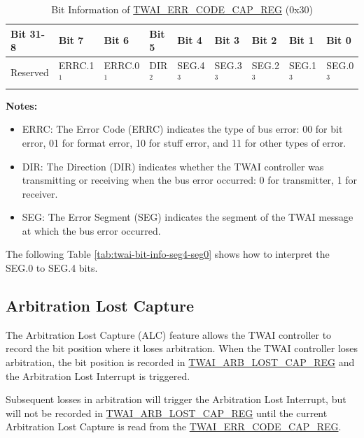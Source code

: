 \documentclass[main\_\_EN.tex]{subfiles}
\begin{document}
\begin{longtable}[c]{|p{1.4cm}|p{1.4cm}|p{1.4cm}|p{1.4cm}|p{1.4cm}|p{1.4cm}|p{1.4cm}|p{1.4cm}|p{1.4cm}|}
    \caption{Bit Information of \hyperref[regdesc:TWAIERRCODECAPREG]{TWAI\_ERR\_CODE\_CAP\_REG} (0x30)}
    \label{tab:twai-bit-info-error-code-cap-reg}\\
    \hline
    \rowcolor{lightgray}
    \textbf{Bit 31-8} & \textbf{Bit 7} & \textbf{Bit 6} & \textbf{Bit 5} & \textbf{Bit 4} & \textbf{Bit 3} & \textbf{Bit 2} & \textbf{Bit 1} & \textbf{Bit 0}\\\hline
    Reserved & ERRC.1$^1$ & ERRC.0$^1$ & DIR$^2$ & SEG.4$^3$ & SEG.3$^3$ & SEG.2$^3$ & SEG.1$^3$ & SEG.0$^3$\\
    \hline
\end{longtable}
\vspace{-1.5em}
{\bfseries Notes:}\\
\begin{itemize}
    \item ERRC: The Error Code (ERRC) indicates the type of bus error: 00 for bit error, 01 for format error, 10 for stuff error, and 11 for other types of error.
    \item DIR: The Direction (DIR) indicates whether the TWAI controller was transmitting or receiving when the bus error occurred: 0 for transmitter, 1 for receiver.
    \item SEG: The Error Segment (SEG) indicates the segment of the TWAI message at which the bus error occurred.
\end{itemize}

The following Table \ref{tab:twai-bit-info-seg4-seg0} shows how to interpret the SEG.0 to SEG.4 bits.



\subsection{Arbitration Lost Capture}

The Arbitration Lost Capture (ALC) feature allows the TWAI controller to record the bit position where it loses arbitration. When the TWAI controller loses arbitration, the bit position is recorded in \hyperref[regdesc:TWAIARBLOSTCAPREG]{TWAI\_ARB\_LOST\_CAP\_REG} and the Arbitration Lost Interrupt is triggered.

Subsequent losses in arbitration will trigger the Arbitration Lost Interrupt, but will not be recorded in \hyperref[regdesc:TWAIARBLOSTCAPREG]{TWAI\_ARB\_LOST\_CAP\_REG} until the current Arbitration Lost Capture is read from the \hyperref[regdesc:TWAIERRCODECAPREG]{TWAI\_ERR\_CODE\_CAP\_REG}.
\end{document}
